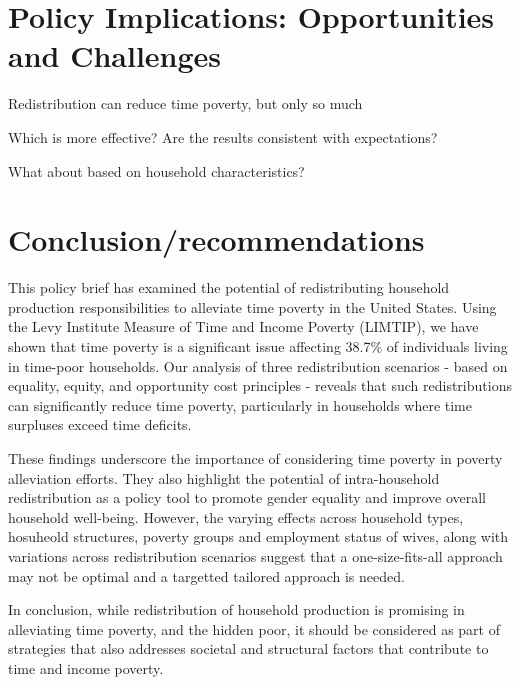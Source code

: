 \documentclass[
  11pt,
]{article}
\begin{document}
\section{Policy Implications: Opportunities and
Challenges}\label{policy-implications-opportunities-and-challenges}

Redistribution can reduce time poverty, but only so much

Which is more effective? Are the results consistent with expectations?

What about based on household characteristics?

\section{Conclusion/recommendations}\label{conclusionrecommendations}

This policy brief has examined the potential of redistributing household
production responsibilities to alleviate time poverty in the United
States. Using the Levy Institute Measure of Time and Income Poverty
(LIMTIP), we have shown that time poverty is a significant issue
affecting 38.7\% of individuals living in time-poor households. Our
analysis of three redistribution scenarios - based on equality, equity,
and opportunity cost principles - reveals that such redistributions can
significantly reduce time poverty, particularly in households where time
surpluses exceed time deficits.

These findings underscore the importance of considering time poverty in
poverty alleviation efforts. They also highlight the potential of
intra-household redistribution as a policy tool to promote gender
equality and improve overall household well-being. However, the varying
effects across household types, hosuheold structures, poverty groups and
employment status of wives, along with variations across redistribution
scenarios suggest that a one-size-fits-all approach may not be optimal
and a targetted tailored approach is needed.

In conclusion, while redistribution of household production is promising
in alleviating time poverty, and the hidden poor, it should be
considered as part of strategies that also addresses societal and
structural factors that contribute to time and income poverty.
\end{document}
